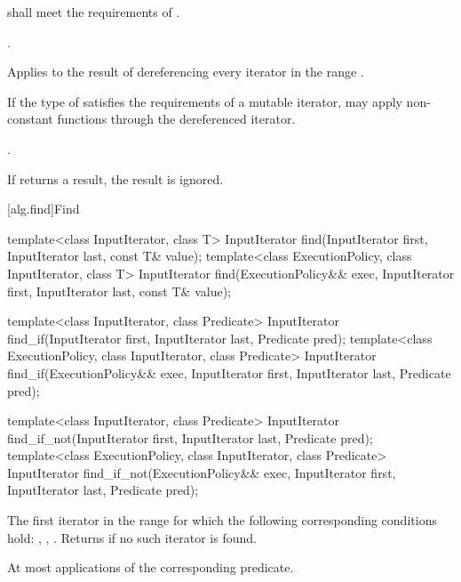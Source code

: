 \begin{itemdescr}
\pnum
\requires
{} shall meet the requirements of .

\pnum
\requires
{}.

\pnum
\effects
Applies  to the result of dereferencing every iterator in the range
.
\begin{note}
If the type of  satisfies the requirements of a mutable iterator,
 may apply non-constant functions through the dereferenced iterator.
\end{note}

\pnum
\returns
{}.

\pnum
\remarks
If  returns a result, the result is ignored.
\end{itemdescr}

[alg.find]{Find}

%
%
%
\begin{itemdecl}
template<class InputIterator, class T>
  InputIterator find(InputIterator first, InputIterator last,
                     const T& value);
template<class ExecutionPolicy, class InputIterator, class T>
  InputIterator find(ExecutionPolicy&& exec, InputIterator first, InputIterator last,
                     const T& value);

template<class InputIterator, class Predicate>
  InputIterator find_if(InputIterator first, InputIterator last,
                        Predicate pred);
template<class ExecutionPolicy, class InputIterator, class Predicate>
  InputIterator find_if(ExecutionPolicy&& exec, InputIterator first, InputIterator last,
                        Predicate pred);

template<class InputIterator, class Predicate>
  InputIterator find_if_not(InputIterator first, InputIterator last,
                            Predicate pred);
template<class ExecutionPolicy, class InputIterator, class Predicate>
  InputIterator find_if_not(ExecutionPolicy&& exec, InputIterator first, InputIterator last,
                            Predicate pred);
\end{itemdecl}

\begin{itemdescr}
\pnum
\returns
The first iterator
in the range
for which the following corresponding
conditions hold:
, , .
Returns  if no such iterator is found.

\pnum
\complexity
At most
applications of the corresponding predicate.
\end{itemdescr}

